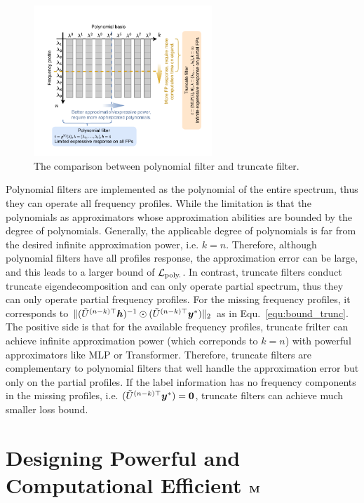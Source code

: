 \documentclass{article} %
\begin{document}
\begin{figure}[h]
	\centering
	\includegraphics[width=0.6\textwidth]{figure/poly_trunc}
	\caption{The comparison between polynomial filter and truncate filter.}
	\label{fig:spec_expr}
\end{figure}
Polynomial filters are implemented as the polynomial of the entire spectrum, thus they can operate all frequency profiles.
While the limitation is that the polynomials as approximators whose approximation abilities are bounded by the degree of polynomials.
Generally, the applicable degree of polynomials is far from the desired infinite approximation power, i.e. $k=n$.
Therefore, although polynomial filters have all profiles response, the approximation error can be large, and this leads to a larger bound of ${\mathcal{L}}_{\textrm{poly.}}$.
In contrast, truncate filters conduct truncate eigendecomposition and can only operate partial spectrum, thus they can only operate partial frequency profiles.
For the missing frequency profiles, it corresponds to $\|(\tilde U^{(n-k)\top}{\bm{h}})^{-1}\odot(\tilde U^{(n-k)\top}{\bm{y}}^*)\|_2$ as in Equ.~\ref{equ:bound_trunc}.
The positive side is that for the available frequency profiles, truncate frilter can achieve infinite approximation power (which correponds to $k=n$) with powerful approximators like MLP or Transformer.
Therefore, truncate filters are complementary to polynomial filters that well handle the approximation error but only on the partial profiles.
If the label information has no frequency components in the missing profiles, i.e. $(\tilde U^{(n-k)\top}{\bm{y}}^*)=\mathbf 0$, truncate filters can achieve much smaller loss bound.



\section{Designing Powerful and Computational Efficient ${\mathbf{M}}$}
\end{document}
